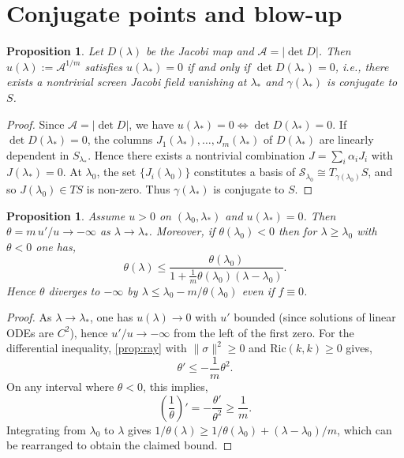\documentclass[a4paper, reqno]{amsart}
\numberwithin{equation}{section}
\theoremstyle{plain}
\newtheorem{proposition}[theorem]{Proposition}
\theoremstyle{definition}
\theoremstyle{remark}
\newcommand{\lam}{\lambda}
\newcommand{\lamo}{\lambda_0}
\begin{document}
\section{Conjugate points and blow-up}\label{sec:conjugate}

\begin{proposition}\label{prop:zero-conjugate}
Let $D(\lam)$ be the Jacobi map and $\mathcal A=|\det D|$. Then $u(\lam):=\mathcal A^{1/m}$ satisfies $u(\lam_*)=0$ if and only if $\det D(\lam_*)=0$, i.e., there exists a nontrivial screen Jacobi field vanishing at $\lam_*$ and $\gamma(\lam_*)$ is conjugate to $S$.
\end{proposition}
\begin{proof}
Since $\mathcal A=|\det D|$, we have $u(\lam_*)=0\iff\det D(\lam_*)=0$. If $\det D(\lam_*)=0$, the columns $J_1(\lam_*),\dots,J_m(\lam_*)$ of $D(\lam_*)$ are linearly dependent in $S_{\lam_*}$. Hence there exists a nontrivial combination $J=\sum_i \alpha_i J_i$ with $J(\lam_*)=0$. At $\lamo$, the set $\{J_i(\lamo)\}$ constitutes a basis of $\mathcal S_{\lamo}\cong T_{\gamma(\lamo)} S$, and so $J(\lamo)\in T S$ is non-zero. Thus $\gamma(\lam_*)$ is conjugate to $S$.

\end{proof}

\begin{proposition}\label{prop:blowup}
Assume $u>0$ on $(\lamo,\lam_*)$ and $u(\lam_*)=0$. Then $\theta=m\,u'/u\to -\infty$ as $\lam\to\lam_*$. Moreover, if $\theta(\lamo)<0$ then for $\lam\ge \lamo$ with $\theta<0$ one has,
$$
\theta(\lam)\le \frac{\theta(\lamo)}{1+\displaystyle\frac{1}{m}\theta(\lamo)(\lam-\lamo)}.
$$
Hence $\theta$ diverges to $-\infty$ by $\lam\le \lamo-m/\theta(\lamo)$ even if $f\equiv 0$.
\end{proposition}
\begin{proof}
As $\lam\to\lam_*$, one has $u(\lam)\to 0$ with $u'$ bounded (since solutions of linear ODEs are $C^2$), hence $u'/u\to -\infty$ from the left of the first zero. For the differential inequality, \cref{prop:ray} with $\|\sigma\|^2\ge 0$ and $\mathrm{Ric}(k,k)\ge 0$ gives,
$$\theta'\le -\frac{1}{m}\theta^2.$$
On any interval where $\theta<0$, this implies,
$$\left(\frac{1}{\theta}\right)'=-\frac{\theta'}{\theta^2}\ge \frac{1}{m}.$$
Integrating from $\lamo$ to $\lam$ gives $1/\theta(\lam)\ge 1/\theta(\lamo)+(\lam-\lamo)/m$, which can be rearranged to obtain the claimed bound.

\end{proof}
\end{document}
